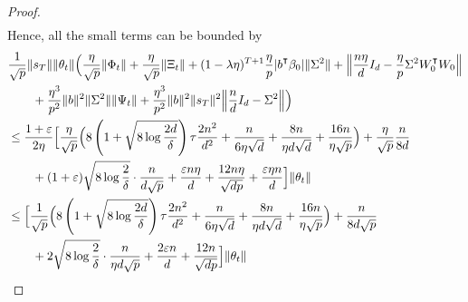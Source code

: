 \begin{proof}
\begin{align*}
    \end{align*}
    Hence, all the small terms can be bounded by
    \begin{align*}
        &\frac{1}{\sqrt{p}} \|s_T\|\|\theta_t\| \Big( \frac{\eta}{\sqrt{p}} \|\Phi_t\| + \frac{\eta}{\sqrt p} \|\Xi_t\| + (1-\lambda\eta)^{T+1} \frac{\eta}{p} |b\transpose\beta_0| \|\Sigma^2\| + \Big\| \frac{n\eta}{d}I_d - \frac{\eta}{p}\Sigma^2 W_0\transpose W_0 \Big\| \\
        & \qquad + \frac{\eta^3}{p^2} \|b\|^2 \|\Sigma^2\| \|\Psi_t\| + \frac{\eta^3}{p^2} \|b\|^2 \|s_T\|^2 \Big\| \frac{n}{d}I_d - \Sigma^2 \Big\| \Big) \\
        & \leq \frac{1+\eps}{2\eta}  \Big[ \frac{\eta}{\sqrt{p}} \Big( 8\left(1 + \sqrt{8\log\frac{2d}{\delta}}\right) \tau \frac{2n^2}{d^2} + \frac{n}{6\eta \sqrt{d}} + \frac{8n}{\eta d\sqrt{d}} + \frac{16n}{\eta\sqrt{p}} \Big) + \frac{\eta}{\sqrt p} \frac{n}{8d} \\
        & \qquad + (1+\eps)\sqrt{8\log\frac{2}{\delta}} \cdot \frac{n}{d\sqrt{p}} + \frac{\eps n\eta}{d} + \frac{12n\eta}{\sqrt{dp}} + \frac{\eps\eta n}{d} \Big] \|\theta_t\| \\
        & \leq \Big[ \frac{1}{\sqrt{p}} \Big( 8\left(1 + \sqrt{8\log\frac{2d}{\delta}}\right) \tau \frac{2n^2}{d^2} + \frac{n}{6\eta \sqrt{d}} + \frac{8n}{\eta d\sqrt{d}} + \frac{16n}{\eta\sqrt{p}} \Big) + \frac{n}{8d\sqrt{p}} \\
        & \qquad + 2\sqrt{8\log\frac{2}{\delta}} \cdot \frac{n}{\eta d\sqrt{p}} + \frac{2\eps n}{d} + \frac{12n}{\sqrt{dp}} \Big] \|\theta_t\|
    \end{align*}
    

\end{proof}
